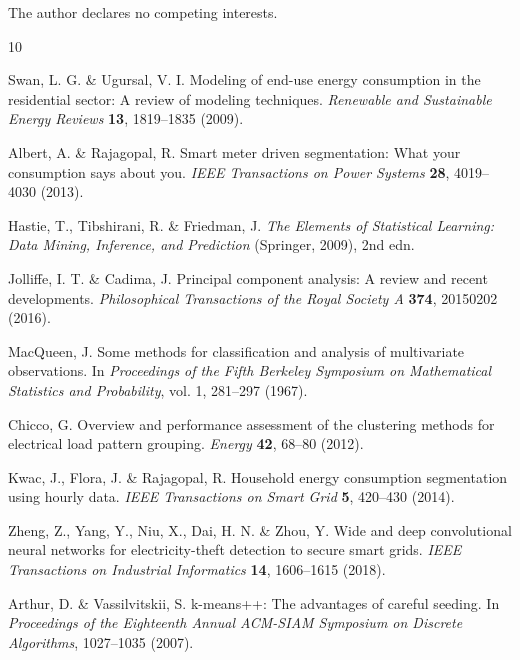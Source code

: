 \documentclass[11pt]{article}
\begin{document}
The author declares no competing interests.

\begin{thebibliography}{10}

Swan, L. G. \& Ugursal, V. I.
\newblock Modeling of end-use energy consumption in the residential sector: A review of modeling techniques.
\newblock \textit{Renewable and Sustainable Energy Reviews} \textbf{13}, 1819--1835 (2009).

Albert, A. \& Rajagopal, R.
\newblock Smart meter driven segmentation: What your consumption says about you.
\newblock \textit{IEEE Transactions on Power Systems} \textbf{28}, 4019--4030 (2013).

Hastie, T., Tibshirani, R. \& Friedman, J.
\newblock \textit{The Elements of Statistical Learning: Data Mining, Inference, and Prediction} (Springer, 2009), 2nd edn.

Jolliffe, I. T. \& Cadima, J.
\newblock Principal component analysis: A review and recent developments.
\newblock \textit{Philosophical Transactions of the Royal Society A} \textbf{374}, 20150202 (2016).

MacQueen, J.
\newblock Some methods for classification and analysis of multivariate observations.
\newblock In \textit{Proceedings of the Fifth Berkeley Symposium on Mathematical Statistics and Probability}, vol. 1, 281--297 (1967).

Chicco, G.
\newblock Overview and performance assessment of the clustering methods for electrical load pattern grouping.
\newblock \textit{Energy} \textbf{42}, 68--80 (2012).

Kwac, J., Flora, J. \& Rajagopal, R.
\newblock Household energy consumption segmentation using hourly data.
\newblock \textit{IEEE Transactions on Smart Grid} \textbf{5}, 420--430 (2014).

Zheng, Z., Yang, Y., Niu, X., Dai, H. N. \& Zhou, Y.
\newblock Wide and deep convolutional neural networks for electricity-theft detection to secure smart grids.
\newblock \textit{IEEE Transactions on Industrial Informatics} \textbf{14}, 1606--1615 (2018).

Arthur, D. \& Vassilvitskii, S.
\newblock k-means++: The advantages of careful seeding.
\newblock In \textit{Proceedings of the Eighteenth Annual ACM-SIAM Symposium on Discrete Algorithms}, 1027--1035 (2007).

\end{thebibliography}
\end{document}
